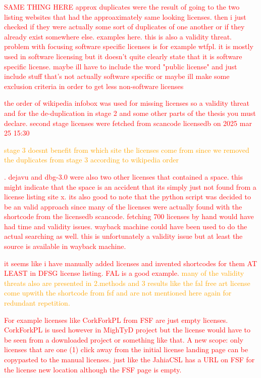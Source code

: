 \textcolor{red}{SAME THING HERE approx duplicates were the result of going to the two listing websites that had the approaximately same looking licenses. then i just checked if they were actually some sort of duplicates of one another or if they already exist somewhere else. examples here. this is also a validity threat. problem with focusing software specific licenses is for example wtfpl. it is mostly used in software licensing but it doesn't quite clearly state that it is software specific license. maybe ill have to include the word "public license" and just include stuff that's not actually software specific or maybe ill make some exclusion criteria in order to get less non-software licenses}

\textcolor{red}{the order of wikipedia infobox was used for missing licenses so a validity threat and for the de-duplication in stage 2 and some other parts of the thesis you must declare. second stage licenses were fetched from scancode licensedb on 2025 mar 25 15:30}

\textcolor{orange}{stage 3 doesnt benefit from which site the licenses come from since we removed the duplicates from stage 3 according to wikipedia order}

\textcolor{red}{. dejavu and dbg-3.0 were also two other licenses that contained a space. this might indicate that the space is an accident that its simply just not found from a license listing site x. its also good to note that the python script was decided to be an valid approach since many of the licenses were actually found with the shortcode from the licensedb scancode. fetching 700 licenses by hand would have had time and validity issues. wayback machine could have been used to do the actual searching as well. this is unfortunately a validity issue but at least the source is available in wayback machine.}

\textcolor{red}{it seems like i have manually added licenses and invented shortcodes for them AT LEAST in DFSG license listing. FAL is a good example.}
\textcolor{orange}{many of the validity threats also are presented in 2.methods and 3 results like the fal free art license come upwith the shortcode from fsf and are not mentioned here again for redundant repetition.}

\textcolor{red}{For example licenses like CorkForkPL from FSF are just empty licenses. CorkForkPL is used however in MighTyD project but the license would have to be seen from a downloaded project or something like that. A new scope: only licenses that are one (1) click away from the initial license landing page can be copypasted to the manual licenses. just like the JahiaCSL has a URL on FSF for the license new location although the FSF page is empty.}

